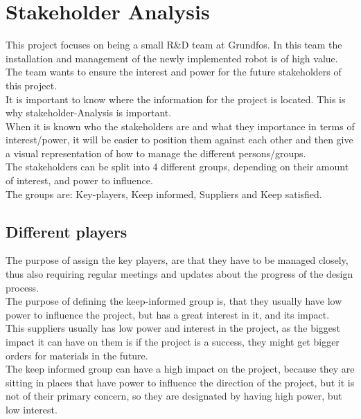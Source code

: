 \chapter{Stakeholder Analysis} \label{ch:Stakeholder Analysis}

This project focuses on being a small R\&D team at Grundfos. In this team the installation and management of the newly implemented robot is of high value.\\
The team wants to ensure the interest and power for the future stakeholders of this project.\\
It is important to know where the information for the project is located. This is why stakeholder-Analysis is important.\\
When it is known who the stakeholders are and what they importance in terms of interest/power, it will be easier to position them against each other and then give a visual representation of how to manage the different persons/groups.\\


The stakeholders can be split into 4 different groups, depending on their amount of interest, and power to influence.\\
The groups are: Key-players, Keep informed, Suppliers and Keep satisfied.\\
\section{Different players}

The purpose of assign the key players, are that they have to be managed closely, thus also requiring regular meetings and updates about the progress of the design process.\\
The purpose of defining the keep-informed group is, that they usually have low power to influence the project, but has a great interest in it, and its impact.\\
This suppliers usually has low power and interest in the project, as the biggest impact it can have on them is if the project is a success, they might get bigger orders for materials in the future.\\
The keep informed group can have a high impact on the project, because they are sitting in places that have power to influence the direction of the project, but it is not of their primary concern, so they are designated by having high power, but low interest.\\




